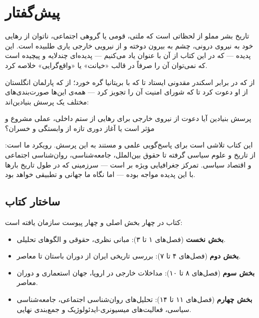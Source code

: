 \chapter*{پیش‌گفتار}

تاریخ بشر مملو از لحظاتی است که ملتی، قومی یا گروهی اجتماعی، ناتوان از رهایی خود به نیروی درونی، چشم به بیرون دوخته و از نیرویی خارجی یاری طلبیده است. این پدیده — که در این کتاب از آن با عنوان  یاد می‌کنیم — پدیده‌ای چندلایه و پیچیده است که نمی‌توان آن را صرفاً در قالب «خیانت» یا «واقع‌گرایی» خلاصه کرد.

از  که در برابر اسکندر مقدونی ایستاد تا  که با بریتانیا گره خورد؛ از  که پارلمان انگلستان از او دعوت کرد تا  که شورای امنیت آن را تجویز کرد — همه‌ی این‌ها صورت‌بندی‌های مختلف یک پرسش بنیادین‌اند:

\begin{histQuote}{پرسش بنیادین}
آیا دعوت از نیروی خارجی برای رهایی از ستم داخلی، عملی مشروع و مؤثر است یا آغاز دوری تازه از وابستگی و خسران؟
\end{histQuote}

این کتاب تلاشی است برای پاسخ‌گویی علمی و مستند به این پرسش. رویکرد ما  است: از تاریخ و علوم سیاسی گرفته تا حقوق بین‌الملل، جامعه‌شناسی، روان‌شناسی اجتماعی و اقتصاد سیاسی. تمرکز جغرافیایی ویژه بر  است — سرزمینی که در طول تاریخ بارها با این پدیده مواجه بوده — اما نگاه ما جهانی و تطبیقی خواهد بود.

\section*{ساختار کتاب}

کتاب در چهار بخش اصلی و چهار پیوست سازمان یافته است:

\begin{itemize}[nosep, rightmargin=1em]
  \item \textbf{بخش نخست} (فصل‌های ۱ تا ۳): مبانی نظری، حقوقی و الگوهای تحلیلی.
  \item \textbf{بخش دوم} (فصل‌های ۴ تا ۷): بررسی تاریخی ایران از دوران باستان تا معاصر.
  \item \textbf{بخش سوم} (فصل‌های ۸ تا ۱۰): مداخلات خارجی در اروپا، جهان استعماری و دوران معاصر.
  \item \textbf{بخش چهارم} (فصل‌های ۱۱ تا ۱۴): تحلیل‌های روان‌شناسی اجتماعی، جامعه‌شناسی سیاسی، فعالیت‌های میسیونری-ایدئولوژیک و جمع‌بندی نهایی.
\end{itemize}

